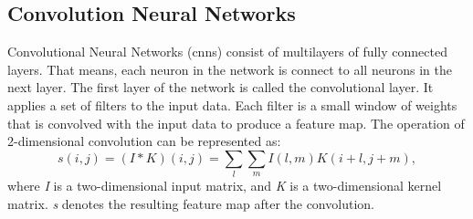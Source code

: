 \subsection{Convolution Neural Networks}
Convolutional Neural Networks (\acrshort{cnn}s) consist of multilayers of fully connected layers. That means, each neuron in the network is connect to all neurons in the next layer. The first layer of the network is called the convolutional layer. It applies a set of filters to the input data. Each filter is a small window of weights that is convolved with the input data to produce a feature map. The operation of 2-dimensional convolution can be represented as:
%
\begin{equation*}s(i,j)=(I*K)(i,j)=\sum \limits _{l}{\sum \limits _{m}{I(l,m)K(i+l,j+m)}},\tag{5}\end{equation*}
%
where \textit{I} is a two-dimensional input matrix, and \textit{K} is a two-dimensional kernel matrix. \textit{s} denotes the resulting feature map after the convolution.


